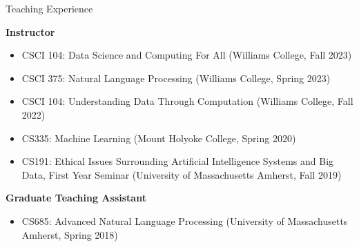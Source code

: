 \documentclass{resume} %
\begin{document}

\begin{rSection}{Teaching Experience}

\textbf{Instructor}
\begin{itemize}
  \item CSCI 104: Data Science and Computing For All (Williams College, Fall 2023)
  \item CSCI 375: Natural Language Processing (Williams College, Spring 2023)
  \item CSCI 104: Understanding Data Through Computation (Williams College, Fall 2022)
  \item CS335: Machine Learning (Mount Holyoke College, Spring 2020)
  \item CS191: Ethical Issues Surrounding Artificial Intelligence Systems and Big Data, First Year Seminar (University of Massachusetts Amherst, Fall 2019)

\end{itemize}

\textbf{Graduate Teaching Assistant}
\begin{itemize}
\item CS685: Advanced Natural Language Processing (University of Massachusetts Amherst, Spring 2018)
\end{itemize}





\end{rSection}
\end{document}
